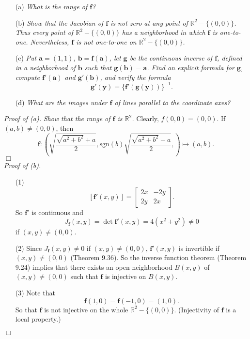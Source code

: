\documentclass{article}
\begin{document}
\begin{enumerate}
\item[(a)]
  \emph{What is the range of $\mathbf{f}$?}

\item[(b)]
  \emph{Show that the Jacobian of $\mathbf{f}$ is not zero
  at any point of $\mathbb{R}^2 - \{(0,0)\}$.
  Thus every point of $\mathbb{R}^2 - \{(0,0)\}$ has a neighborhood
  in which $\mathbf{f}$ is one-to-one.
  Nevertheless, $\mathbf{f}$ is not one-to-one on $\mathbb{R}^2 - \{(0,0)\}$.}

\item[(c)]
  \emph{Put $\mathbf{a} = \left(1, 1\right)$,
  $\mathbf{b} = \mathbf{f}(\mathbf{a})$, let $\mathbf{g}$ be the continuous inverse of $\mathbf{f}$,
  defined in a neighborhood of $\mathbf{b}$ such that $\mathbf{g}(\mathbf{b}) = \mathbf{a}$.
  Find an explicit formula for $\mathbf{g}$,
  compute $\mathbf{f}'(\mathbf{a})$ and $\mathbf{g}'(\mathbf{b})$,
  and verify the formula}
  \[
    \mathbf{g}'(\mathbf{y})
    = \{ \mathbf{f}'(\mathbf{g}(\mathbf{y})) \}^{-1}.
  \]

\item[(d)]
  \emph{What are the images under $\mathbf{f}$ of lines parallel to the coordinate axes?} \\
\end{enumerate}



\emph{Proof of (a).}
  \emph{Show that the range of $\textbf{f}$ is $\mathbb{R}^2$.}
  Clearly, $f(0,0) = (0,0)$.
  If $(a,b) \neq (0,0)$,
  then
  \[
    \mathbf{f}: \left(
      \sqrt{\frac{\sqrt{a^2+b^2}+a}{2}},
      \mathrm{sgn}(b) \sqrt{\frac{\sqrt{a^2+b^2}-a}{2}},
    \right) \mapsto (a,b).
  \]
$\Box$ \\



\emph{Proof of (b).}
\begin{enumerate}
\item[(1)]
  \[
    [\mathbf{f}'(x,y)]
    =
    \begin{bmatrix}
      2x & -2y \\
      2y &  2x
    \end{bmatrix}.
  \]
  So $\mathbf{f}'$ is continuous and
  \[
    J_{\mathbf{f}}(x,y)
    = \det \mathbf{f}'(x,y)
    = 4(x^2+y^2)
    \neq 0
  \]
  if $(x,y) \neq (0,0)$.

\item[(2)]
  Since $J_{\mathbf{f}}(x,y) \neq 0$ if $(x,y) \neq (0,0)$,
  $\mathbf{f}'(x,y)$ is invertible if $(x,y) \neq (0,0)$ (Theorem 9.36).
  So the inverse function theorem (Theorem 9.24) implies that
  there exists an open neighborhood $B(x,y)$ of $(x,y) \neq (0,0)$ such that
  $\mathbf{f}$ is injective on $B(x,y)$.

\item[(3)]
  Note that
  \[
    \mathbf{f}(1,0) = \mathbf{f}(-1,0) = (1,0).
  \]
  So that $\mathbf{f}$ is not injective on the whole $\mathbb{R}^2 - \{(0,0)\}$.
  (Injectivity of $\mathbf{f}$ is a local property.)
\end{enumerate}
$\Box$ \\
\end{document}
